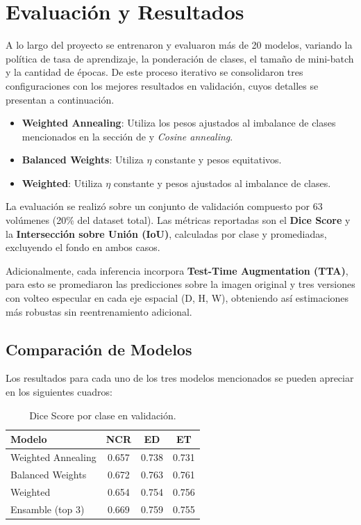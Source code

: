 \section{Evaluación y Resultados}
\label{sec:eval}

A lo largo del proyecto se entrenaron y evaluaron más de 20 modelos, variando la política de tasa de aprendizaje, la ponderación de clases, el tamaño de mini-batch y la cantidad de épocas. De este proceso iterativo se consolidaron tres configuraciones con los mejores resultados en validación, cuyos detalles se presentan a continuación.

\begin{itemize}
    \item \textbf{Weighted Annealing}: Utiliza los pesos ajustados al imbalance de clases mencionados en la sección de  y \textit{Cosine annealing}.
    \item \textbf{Balanced Weights}: Utiliza $\eta$ constante y pesos equitativos.
    \item \textbf{Weighted}: Utiliza $\eta$ constante y pesos ajustados al imbalance de clases.
\end{itemize}


La evaluación se realizó sobre un conjunto de validación compuesto por 63 volúmenes (20\% del dataset total). Las métricas reportadas son el \textbf{Dice Score} y la \textbf{Intersección sobre Unión (IoU)}, calculadas por clase y promediadas, excluyendo el fondo en ambos casos.

Adicionalmente, cada inferencia incorpora \textbf{Test-Time Augmentation (TTA)}, para esto se promediaron las predicciones sobre la imagen original y tres versiones con volteo especular en cada eje espacial (D, H, W), obteniendo así estimaciones más robustas sin reentrenamiento adicional.

\subsection{Comparación de Modelos}

Los resultados para cada uno de los tres modelos mencionados se pueden apreciar en los siguientes cuadros:

\begin{table}[H]
\centering
\small
\setlength{\tabcolsep}{2pt}
\begin{tabular}{|l|c|c|c|}
\hline
\textbf{Modelo} & \textbf{NCR} & \textbf{ED} & \textbf{ET} \\
\hline
Weighted Annealing & 0.657 & 0.738 & 0.731 \\
Balanced Weights   & 0.672 & 0.763 & 0.761 \\
Weighted           & 0.654 & 0.754 & 0.756 \\
\hline
Ensamble (top 3)   & 0.669 & 0.759 & 0.755 \\
\hline
\end{tabular}
\caption{Dice Score por clase en validación.}
\label{tab:dice}
\end{table}

